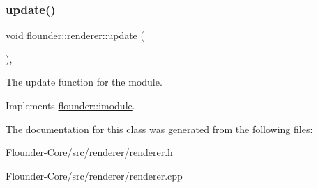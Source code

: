 \subsubsection{\texorpdfstring{update()}{update()}}
{\footnotesize\ttfamily void flounder\+::renderer\+::update (\begin{DoxyParamCaption}{ }\end{DoxyParamCaption})\hspace{0.3cm}{\ttfamily [override]}, {\ttfamily [virtual]}}



The update function for the module. 



Implements \hyperlink{classflounder_1_1imodule_a9a53d48a46b5f6b16a92b2cd8503f74a}{flounder\+::imodule}.



The documentation for this class was generated from the following files\+:\begin{DoxyCompactItemize}
\item 
Flounder-\/\+Core/src/renderer/renderer.\+h\item 
Flounder-\/\+Core/src/renderer/renderer.\+cpp\end{DoxyCompactItemize}
